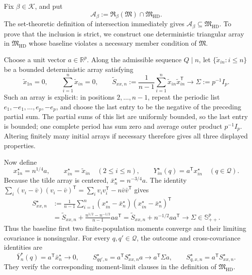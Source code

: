 Fix \(\beta\in\mathcal K\), and put
\[
\mathcal A_\beta
 :=\mathfrak R_\beta(\mathfrak M)\cap\mathfrak M_{\mathrm{HD}}.
\]
The set-theoretic definition of intersection immediately gives
\(\mathcal A_\beta\subseteq\mathfrak M_{\mathrm{HD}}\).  To prove that the
inclusion is strict, we construct one deterministic triangular array in
\(\mathfrak M_{\mathrm{HD}}\) whose baseline violates a necessary member
condition of \(\mathfrak M\).

Choose a unit vector \(a\in\mathbb R^p\).  Along the admissible sequence
\(Q\mid n\), let \(\{\widetilde x_{in}:i\le n\}\) be a bounded deterministic
array satisfying
\[
\widetilde x_{1n}=0,
\qquad
\sum_{i=1}^n\widetilde x_{in}=0,
\qquad
\widetilde S_{xx,n}
 :=\frac1{n-1}\sum_{i=1}^n
       \widetilde x_{in}\widetilde x_{in}^{\mathsf T}
 \longrightarrow \Sigma:=p^{-1}I_p.
\]
Such an array is explicit: in positions \(2,\ldots,n-1\), repeat the
periodic list \(e_1,-e_1,\ldots,e_p,-e_p\), and choose the last entry to be
the negative of the preceding partial sum.  The partial sums of this list
are uniformly bounded, so the last entry is bounded; one complete period
has sum zero and average outer product \(p^{-1}I_p\).  Altering finitely many
initial arrays if necessary therefore gives all three displayed properties.

Now define
\[
x_{1n}^{\star}=n^{1/4}a,
\qquad
x_{in}^{\star}=\widetilde x_{in}\quad(2\le i\le n),
\qquad
Y_{in}^{\star}(q)=a^{\mathsf T}x_{in}^{\star}
\quad(q\in\mathcal Q).
\]
Because the tilde array is centered,
\(\bar x_n^{\star}=n^{-3/4}a\).  The identity
\(\sum_i(v_i-\bar v)(v_i-\bar v)^{\mathsf T}
=\sum_i v_iv_i^{\mathsf T}-n\bar v\bar v^{\mathsf T}\) gives
\[
\begin{aligned}
S_{xx,n}^{\star}
&:=\frac1{n-1}\sum_{i=1}^n
 (x_{in}^{\star}-\bar x_n^{\star})
 (x_{in}^{\star}-\bar x_n^{\star})^{\mathsf T}\\
&=\widetilde S_{xx,n}
  +\frac{n^{1/2}-n^{-1/2}}{n-1}aa^{\mathsf T}
 =\widetilde S_{xx,n}+n^{-1/2}aa^{\mathsf T}
 \longrightarrow \Sigma\in\mathbb S_{++}^p.
\end{aligned}
\]
Thus the baseline first two finite-population moments converge and their
limiting covariance is nonsingular.  For every \(q,q'\in\mathcal Q\), the
outcome and cross-covariance identities are
\[
\bar Y_n^{\star}(q)=a^{\mathsf T}\bar x_n^{\star}\longrightarrow0,
\qquad
S_{qq',n}^{\star}=a^{\mathsf T}S_{xx,n}^{\star}a
 \longrightarrow a^{\mathsf T}\Sigma a,
\qquad
S_{q,x,n}^{\star}=a^{\mathsf T}S_{xx,n}^{\star}.
\]
They verify the corresponding moment-limit clauses in the definition of
\(\mathfrak M_{\mathrm{HD}}\).

